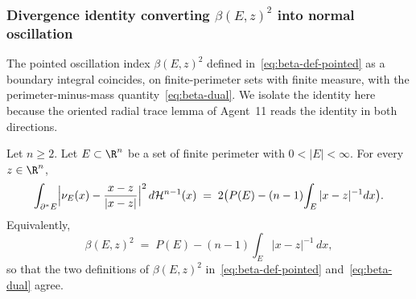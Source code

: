 \subsubsection{Divergence identity converting $\beta(E,z)^2$ into normal
oscillation}\label{ssec:div-identity}

The pointed oscillation index $\beta(E,z)^2$ defined
in~\eqref{eq:beta-def-pointed} as a boundary integral coincides, on
finite-perimeter sets with finite measure, with the perimeter-minus-mass
quantity~\eqref{eq:beta-dual}. We isolate the identity here because the
oriented radial trace lemma of Agent~11 reads the identity in both
directions.

\begin{lemma}
\label{lem:div-identity-FJ}
Let $n\ge 2$. Let $E\subset\R^n$ be a set of finite perimeter with
$0<|E|<\infty$. For every $z\in\R^n$,
\begin{equation}\label{eq:div-identity}
   \int_{\partial^*E}
   \Bigl|\nu_E(x)-\frac{x-z}{|x-z|}\Bigr|^2\,d\mathcal H^{n-1}(x)
   \;=\;
   2\bigl(P(E)-(n-1)\!\int_E|x-z|^{-1}dx\bigr).
\end{equation}
Equivalently,
\begin{equation}\label{eq:beta-equivalence}
   \beta(E,z)^2
   \;=\;
   P(E)-(n-1)\!\int_E|x-z|^{-1}\,dx,
\end{equation}
so that the two definitions of $\beta(E,z)^2$ in~\eqref{eq:beta-def-pointed}
and~\eqref{eq:beta-dual} agree.
\end{lemma}

